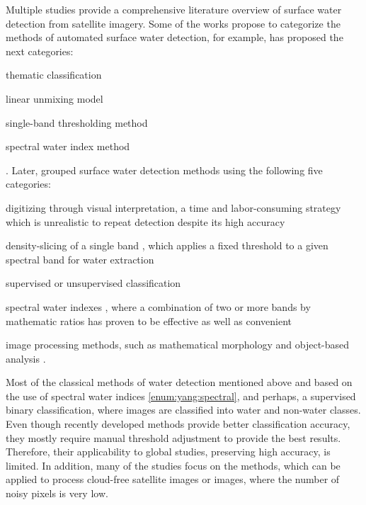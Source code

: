 Multiple studies provide a comprehensive literature overview of surface water detection from satellite imagery. Some of the works propose to categorize the methods of automated surface water detection, for example, \citet{Ji2009} has proposed the next categories:
\begin{enumerate*}[label=(\emph{\alph*})]
	\item \label {enum:ji:thematic} thematic classification \citet{lira2006segmentation}
	\item \label {enum:ji:unmixing} linear unmixing model \citet{sethre2005remote}
	\item \label {enum:ji:th} single-band thresholding method \citet{jain2005delineation}
	\item \label {enum:ji:specral} spectral water index method \citet{McFeeters1996, Xu2006, feyisa2014automated, hoberg2015conditional, fisher2016comparing}
\end{enumerate*}. Later, \citet{yang2015landsat} grouped surface water detection methods using the following five categories: 
\begin{enumerate*}[label=(\emph{\alph*})]
	\item \label {enum:yang:manual} digitizing through visual interpretation, a time and labor-consuming strategy which is unrealistic to repeat detection despite its high accuracy
	\item \label {enum:yang:single} density-slicing of a single band \citet{frazier2000water, ryu2002waterline, white1999monitoring}, which applies a fixed threshold to a given spectral band for water extraction
	\item \label {enum:yang:ml} supervised or unsupervised classification
	\item \label {enum:yang:spectral} spectral water indexes \citet{McFeeters1996, Xu2006, hoberg2015conditional, fisher2016comparing}, where a combination of two or more bands by mathematic ratios has proven to be effective as well as convenient
	\item \label {enum:yang:im} image processing methods, such as mathematical morphology and object-based analysis \citet{blaschke2010object, lira2006segmentation, yang2015landsat}.
\end{enumerate*} 

Most of the classical methods of water detection mentioned above and based on the use of spectral water indices \ref{enum:yang:spectral}, and perhaps, a supervised binary classification, where images are classified into water and non-water classes. Even though recently developed methods provide better classification accuracy, they mostly require manual threshold adjustment to provide the best results. Therefore, their applicability to global studies, preserving high accuracy, is limited. In addition, many of the studies focus on the methods, which can be applied to process cloud-free satellite images or images, where the number of noisy pixels is very low.

